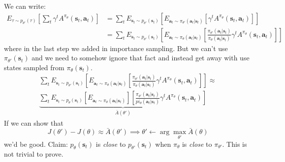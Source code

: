 \documentclass{report}
\newcommand{\argmax}{\arg\!\max}
\begin{document}
We can write:
\begin{align}
E_{ \tau \sim p_{ \theta' } (\tau) } 
\left[ \sum_{t}^{} \gamma^{ t } 
A^{ \pi_{ \theta } } 
(\bm{s}_{t}, \bm{a}_{t} ) \right] &=
\sum_{t}^{} E_{ \bm{s}_{t} \sim p_{ \theta' } (\bm{s}_{t}) }
\left[ 
E_{ \bm{a}_{t} \sim \pi_{ \theta' } (\bm{a}_{t}| \bm{s}_{t} ) }
\left[ 
\gamma^{ t } A^{ \pi_{ \theta } } (\bm{s}_{t}, \bm{a}_{t} )
\right] 
\right] \\
								  &=
\sum_{t}^{} E_{ \bm{s}_{t}\sim p_{ \theta' } (\bm{s}_{t}) }
\left[ 
E_{ \bm{a}_{t} \sim \pi_{ \theta } (\bm{a}_{t}| \bm{s}_{t} ) }
\left[ 
		\frac{\pi_{\theta'} (\bm{a}_{t}| \bm{s}_{t} )}{\pi_{ \theta }(\bm{a}_{t}| \bm{s}_{t} )}
		\gamma^{ t } A^{ \pi_{ \theta } } (\bm{s}_{t}, \bm{a}_{t} )
\right] 
\right] 
\end{align}
where in the last step we added in importance sampling.
But we can't use $ \pi_{ \theta' } (\bm{s}_{t})  $ and we need to somehow ignore that fact
and instead get away with use states sampled from $ \pi_{ \theta } (\bm{s}_{t})  $.
\begin{equation}
		\begin{split}
\sum_{t}^{} E_{ \bm{s}_{t}\sim p_{ \theta' } (\bm{s}_{t}) }
\left[ 
E_{ \bm{a}_{t} \sim \pi_{ \theta } (\bm{a}_{t}| \bm{s}_{t} ) }
\left[ 
		\frac{\pi_{\theta'} (\bm{a}_{t}| \bm{s}_{t} )}{\pi_{ \theta }(\bm{a}_{t}| \bm{s}_{t} )}
		\gamma^{ t } A^{ \pi_{ \theta } } (\bm{s}_{t}, \bm{a}_{t} )
\right] 
\right] 
\approx \\
\underbrace{\sum_{t}^{} E_{ \bm{s}_{t} \sim p_{ \theta } (\bm{s}_{t}) }
\left[ 
E_{ \bm{a}_{t} \sim \pi_{ \theta } (\bm{a}_{t}| \bm{s}_{t} ) }
\right] 
\left[ 
\frac{\pi_{ \theta' }(\bm{a}_{t}| \bm{s}_{t} )}{pi_{ \theta }(\bm{a}_{t}| \bm{s}_{t} )} 
\gamma^{ t } A^{ \pi_{ \theta } } (\bm{s}_{t}, \bm{a}_{t} )
\right]}_{ \bar{A} (\theta') } 
		\end{split}
\end{equation}
If we can show that
\begin{equation}
		J (\theta') - J (\theta) \approx \bar{A} (\theta') \implies
		\theta' \leftarrow \argmax_{\theta'} \bar{A} (\theta)
\end{equation}
we'd be good.
Claim: $ p_{ \theta } (\bm{s}_{t})  $ is \textit{close} to $ p_{ \theta' } (\bm{s}_{t})  $
when $ \pi_{ \theta }  $ is \textit{close} to $ \pi_{ \theta' } $.
This is not trivial to prove.
\end{document}
